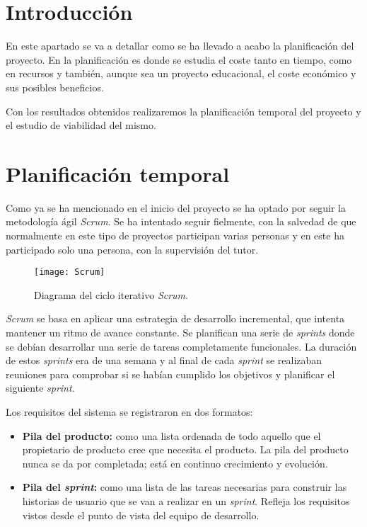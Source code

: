 
\section{Introducción}

En este apartado se va a detallar como se ha llevado a acabo la planificación del proyecto. En la planificación es donde se estudia el coste tanto en tiempo, como en recursos y también, aunque sea un proyecto educacional, el coste económico y sus posibles beneficios.

Con los resultados obtenidos realizaremos la planificación temporal del proyecto y el estudio de viabilidad del mismo. 

\section{Planificación temporal}

Como ya se ha mencionado en el inicio del proyecto se ha optado por seguir la metodología ágil \emph{Scrum}. Se ha intentado seguir fielmente, con la salvedad de que normalmente en este tipo de proyectos participan varias personas y en este ha participado solo una persona, con la supervisión del tutor.

\begin{figure}[H]
	\centering
	\texttt{[image: Scrum]}
	\caption{Diagrama del ciclo iterativo \emph{Scrum}.}
	\label{fig:Scrum}
\end{figure}

\emph{Scrum} se basa en aplicar una estrategia de desarrollo incremental, que intenta mantener un ritmo de avance constante. Se planifican una serie de \emph{sprints} donde se debían desarrollar una serie de tareas completamente funcionales. La duración de estos \emph{sprints} era de una semana y al final de cada \emph{sprint} se realizaban reuniones para comprobar si se habían cumplido los objetivos y planificar el siguiente \emph{sprint}.

Los requisitos del sistema se registraron en dos formatos:

\begin{itemize}
\item \textbf{Pila del producto:} como una  lista ordenada de todo aquello que el propietario de producto cree que necesita el producto. La pila del producto nunca se da por completada; está en continuo crecimiento y evolución.

\item \textbf{Pila del \emph{sprint}:} como una lista de las tareas necesarias para construir las historias de usuario que se van a realizar en un \emph{sprint}. Refleja los requisitos vistos desde el punto de vista del equipo de desarrollo.
 
\end{itemize}

